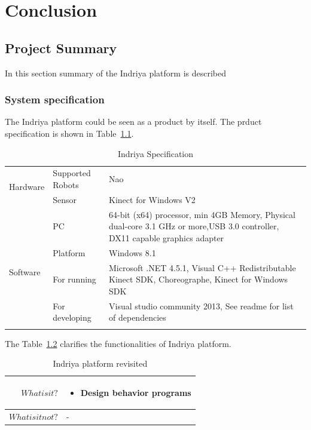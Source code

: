 
\chapter{Conclusion} %
\label{Chapter7} %
\section{Project Summary}
In this section summary of the Indriya platform is described
\subsection{System specification}
 The Indriya platform could be seen as a product by itself. The prduct specification is shown in Table~\ref{table:system}.
\begin{table}
\centering
\caption{Indriya Specification}
\label{table:system}
\begin{tabularx}{\textwidth}{X X X}
\toprule
  \multirow{2}{*}{Hardware} & Supported Robots & Nao \\
                            & Sensor & Kinect for Windows V2 \\
                            & PC & 64-bit (x64) processor, min 4GB Memory, Physical dual-core 3.1 GHz or more,USB 3.0 controller, DX11 capable graphics adapter\\
                                          \toprule                                       
  \multirow{2}{*}{Software} & Platform & Windows 8.1  \\
                            & For running & Microsoft .NET 4.5.1, Visual C++ Redistributable Kinect SDK, Choreographe, Kinect for Windows SDK \\
                            & For developing & Visual studio community 2013, See readme for list of dependencies \\
                                          \tabularnewline\toprule
\end{tabularx}
\end{table}
The Table~\ref{table:platform_revisited} clarifies the functionalities of Indriya platform.

\begin{table}[H]
\centering
\small
\caption{Indriya platform revisited}
\label{table:platform_revisited}
\begin{tabular}{|r|p{10cm}|}
\hline
  \textbf{$What is it?$}  & \begin{itemize}
                            \item Design behavior programs
                            \end{itemize}
  \tabularnewline \hline
  \textbf{$What is it not?$}  & -
  \tabularnewline \hline
\end{tabular}
\end{table}
	
